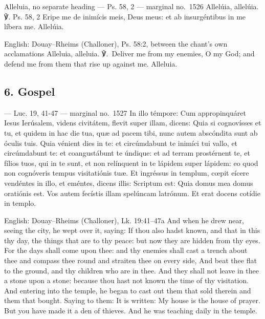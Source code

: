 \begin{appointedlatin}{Alleluia, no separate heading --- Ps. 58, 2 --- marginal no.\ 1526}
Allelúia, allelúia. ℣. \textnormal{Ps. 58, 2} Eripe me de inimícis meis, Deus meus:
et ab insurgéntibus in me líbera me. Allelúia.
\end{appointedlatin}

\begin{namedtranslation}{English: Douay--Rheims (Challoner), Ps. 58:2, between the chant's own acclamations}
Alleluia, alleluia. ℣.~Deliver me from my enemies, O my God; and defend me
from them that rise up against me. Alleluia.
\end{namedtranslation}

\elementguard
\subsection*{6. Gospel }

\begin{appointedlatin}{ --- Luc. 19, 41-47 --- marginal no.\ 1527}
In illo témpore: Cum appropinquáret Iesus Ierúsalem, videns civitátem, flevit
super illam, dicens: Quia si cognovísses et tu, et quidem in hac die tua, quæ
ad pacem tibi, nunc autem abscóndita sunt ab óculis tuis. Quia vénient dies in
te: et circúmdabunt te inimíci tui vallo, et circúmdabunt te: et coangustábunt
te úndique: et ad terram prostérnent te, et fílios tuos, qui in te sunt, et non
relínquent in te lápidem super lápidem: eo quod non cognóveris tempus
visitatiónis tuæ. Et ingréssus in templum, cœpit eícere vendéntes in illo, et
eméntes, dicens illis: Scriptum est: Quia domus mea domus oratiónis est. Vos
autem fecístis illam spelúncam latrónum. Et erat docens cotídie in templo.
\end{appointedlatin}

\begin{namedtranslation}{English: Douay--Rheims (Challoner), Lk. 19:41--47a}
And when he drew near, seeing the city, he wept over it, saying: If thou also
hadst known, and that in this thy day, the things that are to thy peace: but
now they are hidden from thy eyes. For the days shall come upon thee: and thy
enemies shall cast a trench about thee and compass thee round and straiten
thee on every side, And beat thee flat to the ground, and thy children who are
in thee. And they shall not leave in thee a stone upon a stone: because thou
hast not known the time of thy visitation. And entering into the temple, he
began to cast out them that sold therein and them that bought. Saying to them:
It is written: My house is the house of prayer. But you have made it a den of
thieves. And he was teaching daily in the temple.
\end{namedtranslation}


